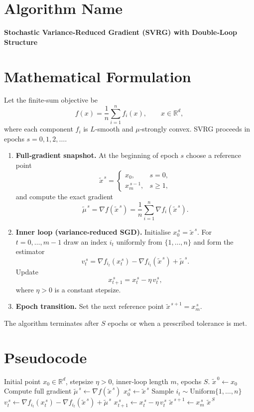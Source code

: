 \documentclass{article}
\newcommand{\R}{\mathbb{R}}
\begin{document}
\section*{Algorithm Name}
\textbf{Stochastic Variance‑Reduced Gradient (SVRG) with Double‑Loop Structure}

\section*{Mathematical Formulation}
Let the finite‑sum objective be  
\[
f(x)=\frac{1}{n}\sum_{i=1}^{n}f_i(x),\qquad x\in\R^{d},
\]
where each component $f_i$ is $L$‑smooth and $\mu$‑strongly convex.  
SVRG proceeds in epochs $s=0,1,2,\dots$.
\begin{enumerate}[label=\arabic*)]
\item \textbf{Full‑gradient snapshot.} At the beginning of epoch $s$ choose a reference point 
\[
\tilde{x}^{\,s}= 
\begin{cases}
x_{0}, & s=0,\\[2mm]
x_{m}^{\,s-1}, & s\ge 1,
\end{cases}
\]
and compute the exact gradient
\[
\tilde{\mu}^{\,s}= \nabla f(\tilde{x}^{\,s})=\frac{1}{n}\sum_{i=1}^{n}\nabla f_i(\tilde{x}^{\,s}).
\]

\item \textbf{Inner loop (variance‑reduced SGD).} Initialise $x_{0}^{\,s}= \tilde{x}^{\,s}$.  
For $t=0,\dots,m-1$ draw an index $i_t$ uniformly from $\{1,\dots,n\}$ and form the estimator
\[
v_{t}^{\,s}= \nabla f_{i_t}\!\left(x_{t}^{\,s}\right)-\nabla f_{i_t}\!\left(\tilde{x}^{\,s}\right)+\tilde{\mu}^{\,s}.
\]
Update
\[
x_{t+1}^{\,s}= x_{t}^{\,s}-\eta\,v_{t}^{\,s},
\]
where $\eta>0$ is a constant stepsize.

\item \textbf{Epoch transition.} Set the next reference point $\tilde{x}^{\,s+1}=x_{m}^{\,s}$.
\end{enumerate}
The algorithm terminates after $S$ epochs or when a prescribed tolerance is met.

\section*{Pseudocode}
\begin{algorithm}[H]
\caption{SVRG (double‑loop)}\label{alg:svrg}
\begin{algorithmic}[1]
\REQUIRE Initial point $x_{0}\in\R^{d}$, stepsize $\eta>0$, inner‑loop length $m$, epochs $S$.
\STATE $\tilde{x}^{\,0}\gets x_{0}$
    \STATE Compute full gradient $\tilde{\mu}^{\,s}\gets \nabla f(\tilde{x}^{\,s})$
    \STATE $x_{0}^{\,s}\gets \tilde{x}^{\,s}$
        \STATE Sample $i_t\sim\text{Uniform}\{1,\dots,n\}$
        \STATE $v_{t}^{\,s}\gets \nabla f_{i_t}(x_{t}^{\,s})-\nabla f_{i_t}(\tilde{x}^{\,s})+\tilde{\mu}^{\,s}$
        \STATE $x_{t+1}^{\,s}\gets x_{t}^{\,s}-\eta\,v_{t}^{\,s}$
    \ENDFOR
    \STATE $\tilde{x}^{\,s+1}\gets x_{m}^{\,s}$
\ENDFOR
\RETURN $\tilde{x}^{\,S}$
\end{algorithmic}
\end{algorithm}
\end{document}

